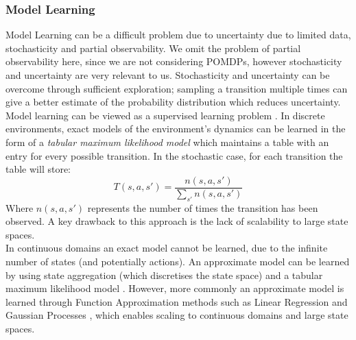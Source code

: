 \subsubsection{Model Learning}
Model Learning can be a difficult problem due to uncertainty due to limited data, stochasticity and partial observability. We omit the problem of partial observability here, since we are not considering POMDPs, however stochasticity and uncertainty are very relevant to us. Stochasticity and uncertainty can be overcome through sufficient exploration; sampling a transition multiple times can give a better estimate of the probability distribution which reduces uncertainty.
\\Model learning can be viewed as a supervised learning problem \cite{JORDAN1992307}. In discrete environments, exact models of the environment's dynamics can be learned in the form of a \textit{tabular maximum likelihood model} \cite{10.1145/122344.122377} which  maintains a table with an entry for every possible transition.
In the stochastic case, for each transition the table will store:
\begin{equation}
\label{eqn:tmlmupdate}
T(s, a, s') = \frac{n(s, a, s')}{\sum_{s'}n(s,a,s')}
\end{equation}
Where $n(s,a,s')$ represents the number of times the transition has been observed.
A key drawback to this approach is the lack of scalability to large state spaces.
\\In continuous domains an exact model cannot be learned, due to the infinite number of states (and potentially actions). An approximate model can be learned by using state aggregation (which discretises the state space) and a tabular maximum likelihood model \cite{Kuvayev1996ModelBasedRL}.
However, more commonly an approximate model is learned through Function Approximation methods such as Linear Regression \cite{DBLP:journals/corr/abs-1206-3285, NIPS2007_b7bb35b9} and Gaussian Processes \cite{10.5555/3104482.3104541}, which enables scaling to continuous domains and large state spaces.


